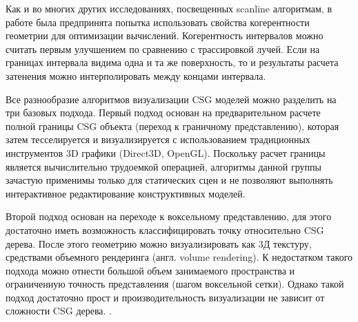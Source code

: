 {{{{{Как и во многих других исследованиях, посвещенных scanline алгоритмам, в работе \todo{[atherton1983]} была предпринята попытка использовать свойства когерентности геометрии для оптимизации вычислений. Когерентность интервалов можно считать первым улучшением по сравнению с трассировкой лучей. Если на границах интервала видима одна и та же поверхность, то и результаты расчета затенения можно интерполировать между концами интервала.

Все разнообразие алгоритмов визуализации CSG моделей можно разделить на три базовых подхода. Первый подход основан на предварительном расчете полной границы CSG объекта (переход к граничному представлению), которая затем тесселируется и визуализируется с использованием традиционных инструментов 3D графики (Direct3D, OpenGL). Поскольку расчет границы является  вычислительно трудоемкой операцией, алгоритмы данной группы зачастую применимы только для статических сцен и не позволяют выполнять интерактивное редактирование конструктивных моделей.

Второй подход основан на переходе к воксельному представлению, для этого достаточно иметь возможность классифицировать точку относительно CSG дерева. После этого геометрию можно визуализировать как 3Д текстуру, средствами объемного рендеринга (англ. volume rendering). К недостатком такого подхода можно отнести большой объем занимаемого пространства и ограниченную точность представления (шагом воксельной сетки). Однако такой подход достаточно прост и производительность визуализации не зависит от сложности CSG дерева. .

}}}}}
